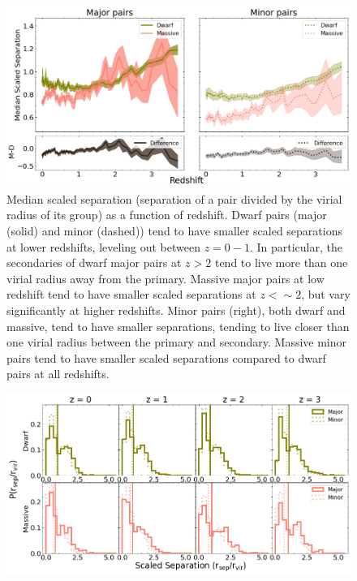 \documentclass[twocolumn]{aastex631}
\begin{document}
\begin{figure}[htb]
  \centering
  \includegraphics[width=\textwidth]{scaledsep.png}
  \caption{Median scaled separation (separation of a pair divided by the virial radius of its group) as a function of redshift. Dwarf pairs (major (solid) and minor (dashed)) tend to have smaller scaled separations at lower redshifts, leveling out between $z=0-1$. In particular, the secondaries of dwarf major pairs at $z>2$ tend to live more than one virial radius away from the primary. Massive major pairs at low redshift tend to have smaller scaled separations  at $z<\sim2$, but vary significantly at higher redshifts. 
  Minor pairs (right), both dwarf and massive, tend to have smaller separations, tending to live closer than one virial radius between the primary and secondary. Massive minor pairs tend to have smaller scaled separations compared to dwarf pairs at all redshifts.
    }
  \label{fig:sep-scaled}
\end{figure}

\begin{figure}[htb]
  \centering
  \includegraphics[width=\textwidth]{scaledsep_distribution.png}
  \caption{}
  \label{fig:sep-scaled-dist}
\end{figure} 
\end{document}
